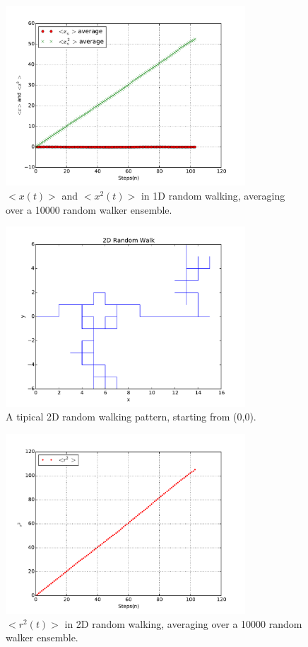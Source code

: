 \documentclass[aps,prl,preprint,superscriptaddress]{revtex4}
\begin{document}
		\begin{figure}[H]
			\centering
			\includegraphics[width=0.8\textwidth]{rwxn.pdf}
			\caption{$ <x(t)> $ and  $ <x^2(t)> $ in 1D random walking, averaging over a 10000 random walker ensemble.}
		\end{figure}
			\begin{figure}[H]
				\centering
				\includegraphics[width=0.8\textwidth]{rwxn3.pdf}
				\caption{A tipical 2D random walking pattern, starting from (0,0).}
			\end{figure}
		\begin{figure}[H]
			\centering
			\includegraphics[width=0.8\textwidth]{rwxn2.pdf}
			\caption{$<r^2(t)>$ in 2D random walking, averaging over a 10000 random walker ensemble.}
		\end{figure}
		
\end{document}

